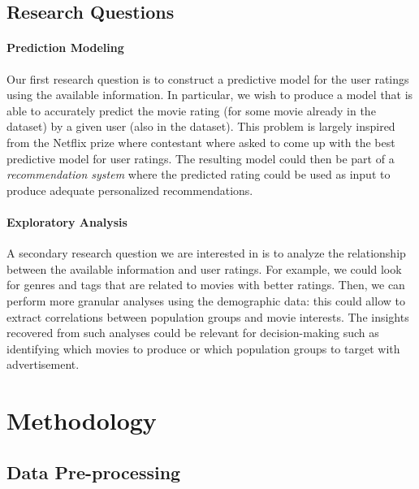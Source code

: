 \documentclass[bj, preprint]{imsart}
\begin{document}
\subsection{Research Questions}\label{subsec:questions}

\paragraph{Prediction Modeling}

Our first research question is to construct a predictive model for the user ratings using the available information. 
In particular, we wish to produce a model that is able to accurately predict the movie rating (for some movie already in the dataset) by a given user (also in the dataset). 
This problem is largely inspired from the Netflix prize \citep{bennett2007netflix} where contestant where asked to come up with the best predictive model for user ratings.
The resulting model could then be part of a \textit{recommendation system} where the predicted rating could be used as input to produce adequate personalized recommendations.

\paragraph{Exploratory Analysis}

A secondary research question we are interested in is to analyze the relationship between the available information and user ratings. 
For example, we could look for genres and tags that are related to movies with better ratings. 
Then, we can perform more granular analyses using the demographic data: this could allow to extract correlations between population groups and movie interests. 
The insights recovered from such analyses could be relevant for decision-making such as identifying which movies to produce or which population groups to target with advertisement.

\section{Methodology}\label{sec:method}

\subsection{Data Pre-processing}\label{subsec:method.preprocess}
\end{document}
